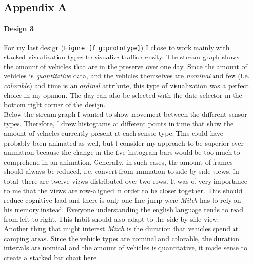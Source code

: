\documentclass{article}
\begin{document}
\begin{appendices}
\section*{Appendix A} \label{appendix:a}
\paragraph{Design 3}
For my last design (\texttt{\hyperref[fig:design3]{Figure~\ref{fig:prototype}}}) I chose to work mainly with stacked visualization types to visualize traffic density. The stream graph shows the amount of vehicles that are in the preserve over one day. Since the amount of vehicles is \textit{quantitative} data, and the vehicles themselves are \textit{nominal} and few (i.e. \textit{colorable}) and time is an \textit{ordinal} attribute, this type of visualization was a perfect choice in my opinion\citep{munzner2015visualization}. The day can also be selected with the date selector in the bottom right corner of the design.\\
Below the stream graph I wanted to show movement between the different sensor types. Therefore, I drew histograms at different points in time that show the amount of vehicles currently present at each sensor type. This could have probably been animated as well, but I consider my approach to be superior over animation because the change in the five histogram bars would be too much to comprehend in an animation. Generally, in such cases, the amount of frames should always be reduced, i.e. convert from animation to side-by-side views. In total, there are twelve views distributed over two rows. It was of very importance to me that the views are row-aligned in order to be closer together. This should reduce cognitive load and there is only one line jump were \textit{Mitch} has to rely on his memory instead\citep{munzner2015visualization}. Everyone understanding the english language tends to read from left to right. This habit should also adapt to the side-by-side view.\\
Another thing that might interest \textit{Mitch} is the duration that vehicles spend at camping areas. Since the vehicle types are nominal and colorable,  the duration intervals are nominal and the amount of vehicles is quantitative, it made sense to create a stacked bar chart here\citep{munzner2015visualization}.

\end{appendices}
\end{document}
